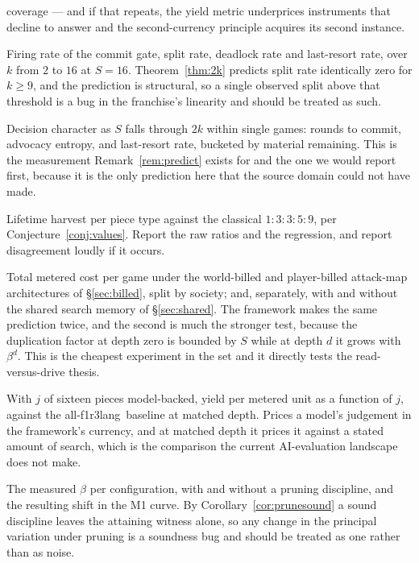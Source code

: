 \documentclass[11pt,a4paper]{article}
\theoremstyle{plain}
\theoremstyle{definition}
\theoremstyle{remark}
\newcommand{\flang}{\textsf{f1r3lang}}
\begin{document}
\begin{description}[leftmargin=2.4em,style=nextline]
coverage --- and if that repeats, the yield metric underprices instruments that
decline to answer and the second-currency principle acquires its second
instance.
\item[M4 --- split and deadlock against $k$.] Firing rate of the commit gate,
split rate, deadlock rate and last-resort rate, over $k$ from $2$ to $16$ at
$S = 16$. Theorem~\ref{thm:2k} predicts split rate identically zero for
$k \geq 9$, and the prediction is structural, so a single observed split above
that threshold is a bug in the franchise's linearity and should be treated as
such.
\item[M5 --- the endgame crossing.] Decision character as $S$ falls through
$2k$ within single games: rounds to commit, advocacy entropy, and last-resort
rate, bucketed by material remaining. This is the measurement
Remark~\ref{rem:predict} exists for and the one we would report first, because
it is the only prediction here that the source domain could not have made.
\item[M6 --- emergent values.] Lifetime harvest per piece type against the
classical $1:3:3:5:9$, per Conjecture~\ref{conj:values}. Report the raw ratios
and the regression, and report disagreement loudly if it occurs.
\item[M7 --- who is billed, at two depths.] Total metered cost per game under
the world-billed and player-billed attack-map architectures of
\S\ref{sec:billed}, split by society; and, separately, with and without the
shared search memory of \S\ref{sec:shared}. The framework makes the same
prediction twice, and the second is much the stronger test, because the
duplication factor at depth zero is bounded by $S$ while at depth $d$ it grows
with $\beta^d$. This is the cheapest experiment in the set and it directly tests
the read-versus-drive thesis.
\item[M8 --- the aperture's price.] With $j$ of sixteen pieces
model-backed, yield per metered unit as a function of $j$, against the
all-\flang\ baseline at matched depth. Prices a model's judgement in the
framework's currency, and at matched depth it prices it against a stated amount
of search, which is the comparison the current AI-evaluation landscape does not
make.

\item[M9 --- what pruning buys.] The measured $\beta$ per configuration, with
and without a pruning discipline, and the resulting shift in the M1 curve.
By Corollary~\ref{cor:prunesound} a sound discipline leaves the attaining
witness alone, so any change in the principal variation under pruning is a
soundness bug and should be treated as one rather than as noise.


\end{description}
\end{document}
